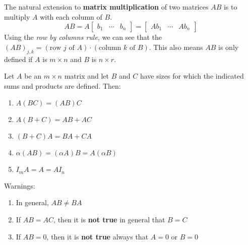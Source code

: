 \begin{definition}
The natural extension to \textbf{matrix multiplication} of two matrices $AB$ is to multiply $A$ with each column of $B$. 
$$AB = A \begin{bmatrix}
b_{1} & \cdots & b_{n}
\end{bmatrix} = \begin{bmatrix}
Ab_{1} & \cdots & Ab_{n}
\end{bmatrix}$$
Using the \textit{row by columns rule}, we can see that the $(AB)_{j,k} = (\text{row $j$ of $A$}) \cdot (\text{column $k$ of $B$})$. This also means $AB$ is only defined if $A$ is $m \times n$ and $B$ is $n \times r$. 

Let $A$ be an $m \times n$ matrix and let $B$ and $C$ have sizes for which the indicated sums and products are defined. Then:
\begin{enumerate}
	\item $A(BC) = (AB)C$
	\item $A(B + C) = AB + AC$
	\item $(B + C)A = BA + CA $
	\item $\alpha (AB) = (\alpha A)B = A(\alpha B)$
	\item $I_m A = A = AI_n$
\end{enumerate}
Warnings: 
\begin{enumerate}
	\item In general, $AB \neq BA$ 
	\item If $AB = AC$, then it is \textbf{not true} in general that $B=C$
	\item If $AB = 0$, then it is \textbf{not true} always that $A=0$ or $B=0$
\end{enumerate}
\end{definition}

